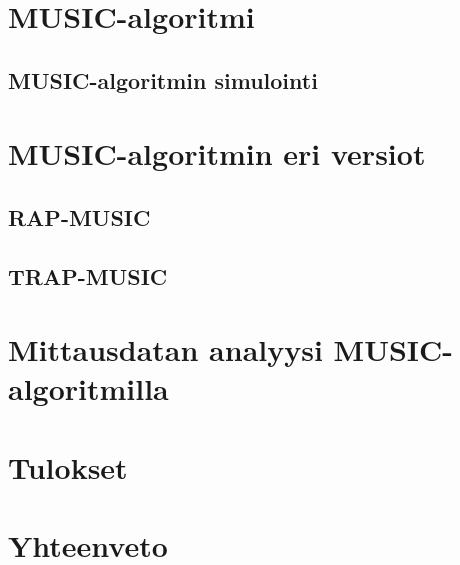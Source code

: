 \documentclass[finnish, 12pt, a4paper, elec, utf8, a-1b, online]{aaltothesis}
\date{15.9.2018}
\begin{document}
	
\makecoverpage{}

\begin{abstractpage}[finnish]
	\abstracttext{}
\end{abstractpage}

\newpage

\thesistableofcontents

\clearpage



\clearpage
\section{MUSIC-algoritmi}

\subsection{MUSIC-algoritmin simulointi}
\section{MUSIC-algoritmin eri versiot}
\subsection{RAP-MUSIC}
\subsection{TRAP-MUSIC}
\section{Mittausdatan analyysi MUSIC-algoritmilla}
\section{Tulokset}
\section{Yhteenveto}
\clearpage


\end{document}
